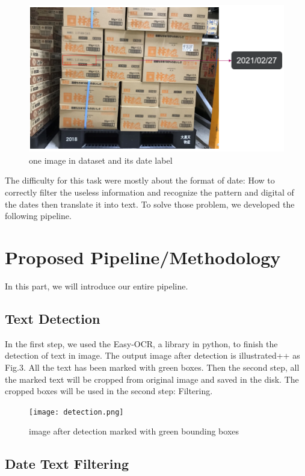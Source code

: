 \documentclass{article}
\begin{document}
\begin{figure}[ht] \centering    
	\label{dataset}     
	\includegraphics[width=0.8\columnwidth]{dataset.png}  
   
	\caption{one image in dataset and its date label}
\end{figure}

The difficulty for this task were mostly about the format of date: How to correctly filter the useless information and recognize the pattern and digital of the dates then translate it into text. To solve those problem, we developed the following pipeline.

\section{Proposed Pipeline/Methodology}

In this part, we will introduce our entire pipeline.

\subsection{Text Detection}

In the first step, we used the Easy-OCR, a library in python, to finish the detection of text in image. The output image after detection is illustrated++ as Fig.3. All the text has been marked with green boxes. Then the second step, all the marked text will be cropped from original image and saved in the disk. The cropped boxes will be used in the second step: Filtering.

\begin{figure}[ht] \centering    
	\label{detection}     
	\texttt{[image: detection.png]}  
   
	\caption{image after detection marked with green bounding boxes}
\end{figure}

\subsection{Date Text Filtering}
\end{document}
